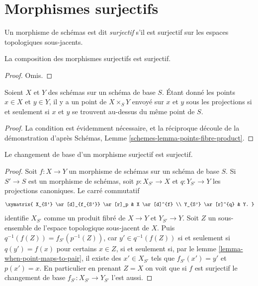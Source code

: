 \section{Morphismes surjectifs}
\label{section-surjective}

\begin{definition}
\label{definition-surjective}
Un morphisme de schémas est dit {\it surjectif}
s'il est surjectif sur les espaces topologiques
sous-jacents.
\end{definition}

\begin{lemma}
\label{lemma-composition-surjective}
La composition des morphismes surjectifs est surjectif.
\end{lemma}

\begin{proof}
Omis.
\end{proof}

\begin{lemma}
\label{lemma-when-point-maps-to-pair}
Soient $X$ et $Y$ des schémas sur un schéma de base $S$. Étant donné les points $x \in X$
et $y \in Y$, il y a un point de $X \times_S Y$ envoyé sur $x$ et $y$ sous les projections
si et seulement si $x$ et $y$ se trouvent au-dessus du même point de $S$.
\end{lemma}

\begin{proof}
La condition est évidemment nécessaire, et la réciproque découle de
la démonstration d'après Schémas, Lemme \ref{schemes-lemma-points-fibre-product}.
\end{proof}

\begin{lemma}
\label{lemma-base-change-surjective}
Le changement de base d'un morphisme surjectif est surjectif.
\end{lemma}

\begin{proof}
Soit $f: X \to Y$ un morphisme de schémas sur un schéma de base $S$.
Si $S' \to S$ est un morphisme de schémas, soit $p: X_{S'} \to X$
et $q: Y_{S'} \to Y$ les projections canoniques. Le carré
commutatif
$$
\xymatrix{
X_{S'} \ar[d]_{f_{S'}} \ar[r]_p & X \ar[d]^{f} \\
Y_{S'} \ar[r]^{q} & Y.
}
$$
identifie $X_{S'}$ comme un produit fibré de $X \to Y$
et $Y_{S'} \to Y$. Soit $Z$ un sous-ensemble de l'espace
topologique sous-jacent de $X$. Puis $q^{-1}(f(Z)) = f_{S'}(p^{-1}(Z))$,
car $y' \in q^{-1}(f(Z))$ si et seulement si $q(y') = f(x)$ pour certains $x \in Z$,
si et seulement si, par le lemme \ref{lemma-when-point-maps-to-pair}, il existe des $x' \in X_{S'}$
tels que $f_{S'}(x') = y'$ et $p(x') = x$. En particulier en prenant $Z = X$
on voit que si $f$ est surjectif le changement de base
$f_{S'}: X_{S'} \to Y_{S'}$ l'est aussi.
\end{proof}

